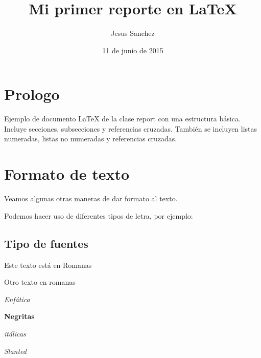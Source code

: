 \documentclass[letterpaper,12pt]{report}
\title{Mi primer reporte en \LaTeX{}}
\author{Jesus Sanchez}
\date{11 de junio de 2015}
\begin{document}
\maketitle


\tableofcontents

\pagebreak

\chapter*{Prologo}

Ejemplo de documento \LaTeX{} de la clase {\ttfamily report} con una estructura básica. 
Incluye secciones, subsecciones y referencias cruzadas. También se incluyen listas numeradas,
listas no numeradas y referencias cruzadas.

\chapter{Formato de texto}

Veamos algunas otras maneras de dar formato al texto.

Podemos hacer uso de diferentes tipos de letra, por ejemplo:


\section{Tipo de fuentes}

\textrm{Este texto está en Romanas}

{\rm Otro texto en romanas}

\smallskip

\emph{Enfática}

\smallskip

\textbf{Negritas}

\medskip

\textit{itálicas}

\bigskip

\textsl{Slanted}
\end{document}
